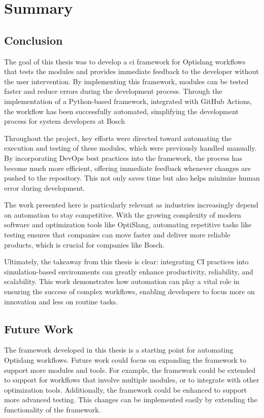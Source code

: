 \chapter{Summary}
\section{Conclusion}
The goal of this thesis was to develop a \acrlong{ci} framework for Optislang workflows that tests the modules and provides immediate feedback to the developer
without the user intervention. 
By implementing this framework, modules can be tested faster and reduce errors during the development process. Through the implementation of a Python-based framework, 
integrated with GitHub Actions, the workflow has been successfully automated, simplifying the development process for system developers at Bosch

Throughout the project, key efforts were directed toward automating the execution and testing of these modules, which were previously handled manually. 
By incorporating DevOps best practices into the framework, the process has become much more efficient, offering immediate feedback whenever changes are 
pushed to the repository. This not only saves time but also helps minimize human error during development.

The work presented here is particularly relevant as industries increasingly depend on automation to stay competitive. With the growing complexity of modern 
software and optimization tools like OptiSlang, automating repetitive tasks like testing ensures that companies can move faster and deliver more reliable 
products, which is crucial for companies like Bosch.

Ultimately, the takeaway from this thesis is clear: integrating CI practices into simulation-based environments can greatly enhance productivity, reliability, 
and scalability. This work demonstrates how automation can play a vital role in ensuring the success of complex workflows, enabling developers to focus more 
on innovation and less on routine tasks.

\section{Future Work}
The framework developed in this thesis is a starting point for automating Optislang workflows. Future work could focus on expanding the framework to support 
more modules and tools. For example, the framework could be extended to support for workflows that involve multiple modules, or to integrate with other 
optimization tools. Additionally, the framework could be enhanced to support more advanced testing. This changes can be implemented easily by extending the 
functionality of the framework. 

